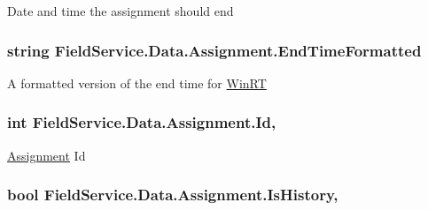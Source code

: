 Date and time the assignment should end 

\hypertarget{class_field_service_1_1_data_1_1_assignment_aea3afae0bbc681381087b2f2678df4da}{
\subsubsection[{End\+Time\+Formatted}]{\setlength{\rightskip}{0pt plus 5cm}string Field\+Service.\+Data.\+Assignment.\+End\+Time\+Formatted\hspace{0.3cm}{\ttfamily [get]}}}\label{class_field_service_1_1_data_1_1_assignment_aea3afae0bbc681381087b2f2678df4da}


A formatted version of the end time for \hyperlink{namespace_field_service_1_1_win_r_t}{Win\+R\+T} 

\hypertarget{class_field_service_1_1_data_1_1_assignment_a4282ea97277a5b6f8832398809b6ebbe}{
\subsubsection[{Id}]{\setlength{\rightskip}{0pt plus 5cm}int Field\+Service.\+Data.\+Assignment.\+Id\hspace{0.3cm}{\ttfamily [get]}, {\ttfamily [set]}}}\label{class_field_service_1_1_data_1_1_assignment_a4282ea97277a5b6f8832398809b6ebbe}


\hyperlink{class_field_service_1_1_data_1_1_assignment}{Assignment} Id 

\hypertarget{class_field_service_1_1_data_1_1_assignment_a8b2489531f212e5a9ace20b2198a413c}{
\subsubsection[{Is\+History}]{\setlength{\rightskip}{0pt plus 5cm}bool Field\+Service.\+Data.\+Assignment.\+Is\+History\hspace{0.3cm}{\ttfamily [get]}, {\ttfamily [set]}}}\label{class_field_service_1_1_data_1_1_assignment_a8b2489531f212e5a9ace20b2198a413c}


